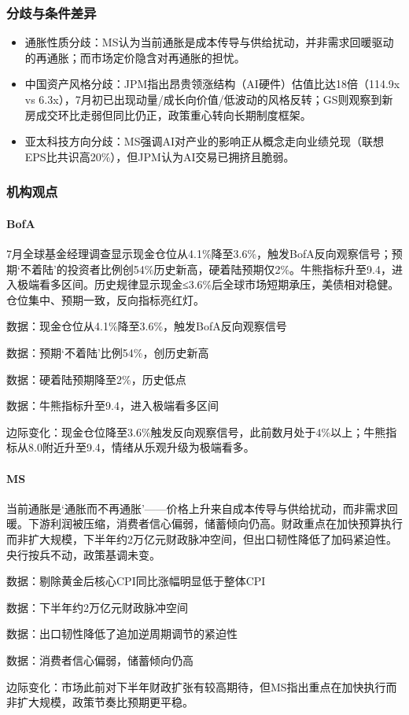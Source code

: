 \documentclass[11pt]{ctexart}
\begin{document}
\subsubsection*{分歧与条件差异}
\begin{itemize}
  \item 通胀性质分歧：MS认为当前通胀是成本传导与供给扰动，并非需求回暖驱动的再通胀；而市场定价隐含对再通胀的担忧。
  \item 中国资产风格分歧：JPM指出昂贵领涨结构（AI硬件）估值比达18倍（114.9x vs 6.3x），7月初已出现动量/成长向价值/低波动的风格反转；GS则观察到新房成交环比走弱但同比仍正，政策重心转向长期制度框架。
  \item 亚太科技方向分歧：MS强调AI对产业的影响正从概念走向业绩兑现（联想EPS比共识高20\%），但JPM认为AI交易已拥挤且脆弱。
\end{itemize}
\subsubsection*{机构观点}
\paragraph{BofA} 7月全球基金经理调查显示现金仓位从4.1\%降至3.6\%，触发BofA反向观察信号；预期‘不着陆’的投资者比例创54\%历史新高，硬着陆预期仅2\%。牛熊指标升至9.4，进入极端看多区间。历史规律显示现金≤3.6\%后全球市场短期承压，美债相对稳健。仓位集中、预期一致，反向指标亮红灯。
{\small\color{refgray}数据：现金仓位从4.1\%降至3.6\%，触发BofA反向观察信号\par}
{\small\color{refgray}数据：预期‘不着陆’比例54\%，创历史新高\par}
{\small\color{refgray}数据：硬着陆预期降至2\%，历史低点\par}
{\small\color{refgray}数据：牛熊指标升至9.4，进入极端看多区间\par}
{\small\color{refgray}边际变化：现金仓位降至3.6\%触发反向观察信号，此前数月处于4\%以上；牛熊指标从8.0附近升至9.4，情绪从乐观升级为极端看多。\par}
\paragraph{MS} 当前通胀是‘通胀而不再通胀’——价格上升来自成本传导与供给扰动，而非需求回暖。下游利润被压缩，消费者信心偏弱，储蓄倾向仍高。财政重点在加快预算执行而非扩大规模，下半年约2万亿元财政脉冲空间，但出口韧性降低了加码紧迫性。央行按兵不动，政策基调未变。
{\small\color{refgray}数据：剔除黄金后核心CPI同比涨幅明显低于整体CPI\par}
{\small\color{refgray}数据：下半年约2万亿元财政脉冲空间\par}
{\small\color{refgray}数据：出口韧性降低了追加逆周期调节的紧迫性\par}
{\small\color{refgray}数据：消费者信心偏弱，储蓄倾向仍高\par}
{\small\color{refgray}边际变化：市场此前对下半年财政扩张有较高期待，但MS指出重点在加快执行而非扩大规模，政策节奏比预期更平稳。\par}
\end{document}
